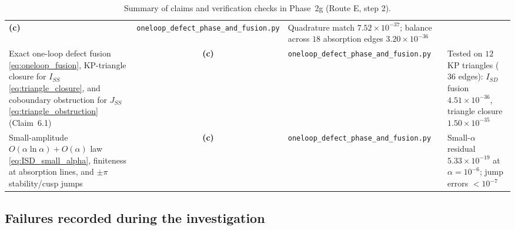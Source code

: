 \documentclass[11pt,a4paper]{article}
\begin{document}
\begin{table}[htbp]
\begin{tabular}{>{\raggedright\arraybackslash}p{4.3cm} c >{\raggedright\arraybackslash}p{5.6cm} >{\raggedright\arraybackslash}p{3.8cm}}
\textbf{(c)} & \texttt{oneloop\_defect\_phase\_and\_fusion.py} &
Quadrature match $7.52\times 10^{-37}$; balance across $18$ absorption edges $3.20\times 10^{-36}$ \\
\addlinespace
Exact one-loop defect fusion \eqref{eq:oneloop_fusion}, KP-triangle closure for $I_{SS}$ \eqref{eq:triangle_closure}, and coboundary obstruction for $J_{SS}$ \eqref{eq:triangle_obstruction} (Claim~6.1) &
\textbf{(c)} & \texttt{oneloop\_defect\_phase\_and\_fusion.py} &
Tested on $12$ KP triangles ($36$ edges): $I_{SD}$ fusion $4.51\times 10^{-36}$, triangle closure $1.50\times 10^{-35}$ \\
\addlinespace
Small-amplitude $O(\alpha\ln\alpha)+O(\alpha)$ law \eqref{eq:ISD_small_alpha}, finiteness at absorption lines, and $\pm\pi$ stability/cusp jumps &
\textbf{(c)} & \texttt{oneloop\_defect\_phase\_and\_fusion.py} &
Small-$\alpha$ residual $5.33\times 10^{-19}$ at $\alpha=10^{-6}$; jump errors $<10^{-7}$ \\
\bottomrule
\end{tabular}
\caption{Summary of claims and verification checks in Phase~2g (Route E, step 2).}
\label{tab:summary}
\end{table}

\subsection*{Failures recorded during the investigation}
\end{document}
